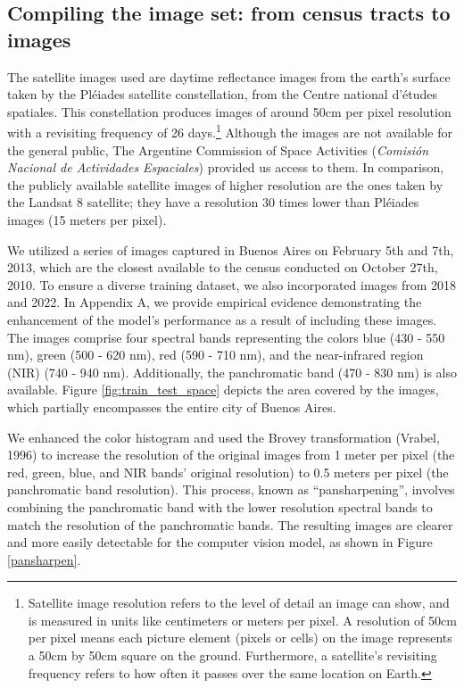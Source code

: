 \documentclass[conference]{IEEEtran}
\begin{document}
\subsection{Compiling the image set: from census tracts to images}\label{training}

The satellite images used are daytime reflectance images from the earth’s surface taken by the Pléiades satellite constellation, from the Centre national d’études spatiales. This constellation produces images of around 50cm per pixel resolution with a revisiting frequency of 26 days.\footnote{Satellite image resolution refers to the level of detail an image can show, and is measured in units like centimeters or meters per pixel. A resolution of 50cm per pixel means each picture element (pixels or cells) on the image represents a 50cm by 50cm square on the ground. Furthermore, a satellite's revisiting frequency refers to how often it passes over the same location on Earth.} Although the images are not available for the general public, The Argentine Commission of Space Activities (\textit{Comisión Nacional de Actividades Espaciales}) provided us access to them. In comparison, the publicly available satellite images of higher resolution are the ones taken by the Landsat 8 satellite; they have a resolution 30 times lower than Pléiades images (15 meters per pixel).

We utilized a series of images captured in Buenos Aires on February 5th and 7th, 2013, which are the closest available to the census conducted on October 27th, 2010. To ensure a diverse training dataset, we also incorporated images from 2018 and 2022. In Appendix A, we provide empirical evidence demonstrating the enhancement of the model's performance as a result of including these images. The images comprise four spectral bands representing the colors blue (430 - 550 nm), green (500 - 620 nm), red (590 - 710 nm), and the near-infrared region (NIR) (740 - 940 nm). Additionally, the panchromatic band (470 - 830 nm) is also available. Figure \ref{fig:train_test_space} depicts the area covered by the images, which partially encompasses the entire city of Buenos Aires.

We enhanced the color histogram and used the Brovey transformation (Vrabel, 1996) to increase the resolution of the original images from 1 meter per pixel (the red, green, blue, and NIR bands' original resolution) to 0.5 meters per pixel (the panchromatic band resolution). This process, known as ``pansharpening'', involves combining the panchromatic band with the lower resolution spectral bands to match the resolution of the panchromatic bands. The resulting images are clearer and more easily detectable for the computer vision model, as shown in Figure \ref{pansharpen}.
\end{document}
